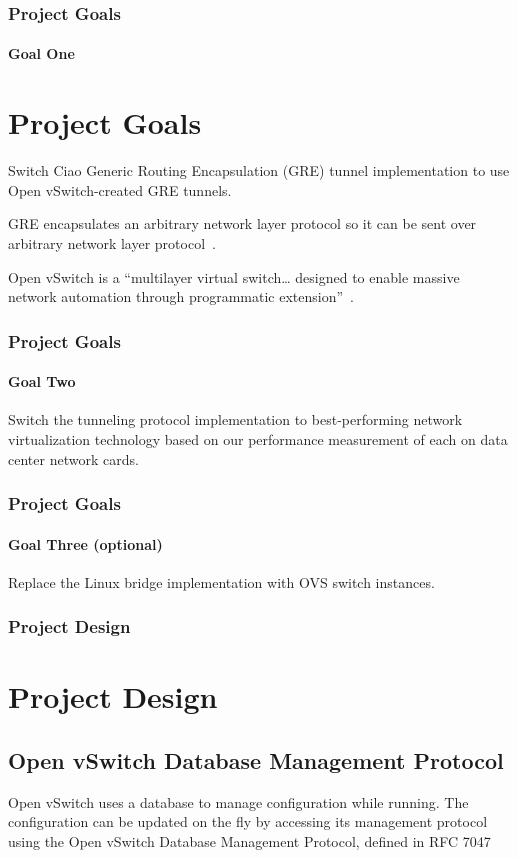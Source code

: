 \documentclass[pdf]{beamer}
\begin{document}
\begin{frame}
	\frametitle{Project Goals}
	\framesubtitle{Goal One}
	\section{Project Goals}
	Switch Ciao Generic Routing Encapsulation (GRE) tunnel implementation to
	use Open vSwitch-created GRE tunnels.

	\begin{description}[style=nextline]
		\item[Generic Routing Encapsulation (GRE)]
			GRE encapsulates an arbitrary network layer protocol so
			it can be sent over arbitrary network layer
			protocol~\cite{rfc1701}.
		\item[Open vSwitch (OVS)]
			Open vSwitch is a ``multilayer virtual switch\ldots
			designed to enable massive network automation through
			programmatic extension''~\cite{ovs}.
	\end{description}
\end{frame}

\begin{frame}
	\frametitle{Project Goals}
	\framesubtitle{Goal Two}
	Switch the tunneling protocol implementation to best-performing network
	virtualization technology based on our performance measurement of each
	on data center network cards.
\end{frame}

\begin{frame}
	\frametitle{Project Goals}
	\framesubtitle{Goal Three (optional)}
	Replace the Linux bridge implementation with OVS switch instances.
\end{frame}

\begin{frame}
	\frametitle{Project Design}
	\section{Project Design}
	\subsection{Open vSwitch Database Management Protocol}

	Open vSwitch uses a database to manage configuration while running.
	The configuration can be updated on the fly by accessing its management
	protocol using the Open vSwitch Database Management Protocol, defined
	in RFC 7047\cite{rfc7047}
\end{frame}
\end{document}
